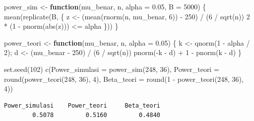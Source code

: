 \documentclass[
  indonesian,
  letterpaper,
]{book}
\newenvironment{Shaded}{\begin{snugshade}}{\end{snugshade}}
\newcommand{\AttributeTok}[1]{\textcolor[rgb]{0.40,0.45,0.13}{#1}}
\newcommand{\ControlFlowTok}[1]{\textcolor[rgb]{0.00,0.23,0.31}{\textbf{#1}}}
\newcommand{\DecValTok}[1]{\textcolor[rgb]{0.68,0.00,0.00}{#1}}
\newcommand{\FloatTok}[1]{\textcolor[rgb]{0.68,0.00,0.00}{#1}}
\newcommand{\FunctionTok}[1]{\textcolor[rgb]{0.28,0.35,0.67}{#1}}
\newcommand{\NormalTok}[1]{\textcolor[rgb]{0.00,0.23,0.31}{#1}}
\newcommand{\OtherTok}[1]{\textcolor[rgb]{0.00,0.23,0.31}{#1}}
\newcommand{\SpecialCharTok}[1]{\textcolor[rgb]{0.37,0.37,0.37}{#1}}
\begin{document}
\begin{Shaded}
\begin{Highlighting}[]
\NormalTok{power\_sim }\OtherTok{\textless{}{-}} \ControlFlowTok{function}\NormalTok{(mu\_benar, n, }\AttributeTok{alpha =} \FloatTok{0.05}\NormalTok{, }\AttributeTok{B =} \DecValTok{5000}\NormalTok{) \{}
  \FunctionTok{mean}\NormalTok{(}\FunctionTok{replicate}\NormalTok{(B, \{}
\NormalTok{    z }\OtherTok{\textless{}{-}}\NormalTok{ (}\FunctionTok{mean}\NormalTok{(}\FunctionTok{rnorm}\NormalTok{(n, mu\_benar, }\DecValTok{6}\NormalTok{)) }\SpecialCharTok{{-}} \DecValTok{250}\NormalTok{) }\SpecialCharTok{/}\NormalTok{ (}\DecValTok{6} \SpecialCharTok{/} \FunctionTok{sqrt}\NormalTok{(n))}
    \DecValTok{2} \SpecialCharTok{*}\NormalTok{ (}\DecValTok{1} \SpecialCharTok{{-}} \FunctionTok{pnorm}\NormalTok{(}\FunctionTok{abs}\NormalTok{(z))) }\SpecialCharTok{\textless{}=}\NormalTok{ alpha}
\NormalTok{  \}))}
\NormalTok{\}}

\NormalTok{power\_teori }\OtherTok{\textless{}{-}} \ControlFlowTok{function}\NormalTok{(mu\_benar, n, }\AttributeTok{alpha =} \FloatTok{0.05}\NormalTok{) \{}
\NormalTok{  k }\OtherTok{\textless{}{-}} \FunctionTok{qnorm}\NormalTok{(}\DecValTok{1} \SpecialCharTok{{-}}\NormalTok{ alpha }\SpecialCharTok{/} \DecValTok{2}\NormalTok{); d }\OtherTok{\textless{}{-}}\NormalTok{ (mu\_benar }\SpecialCharTok{{-}} \DecValTok{250}\NormalTok{) }\SpecialCharTok{/}\NormalTok{ (}\DecValTok{6} \SpecialCharTok{/} \FunctionTok{sqrt}\NormalTok{(n))}
  \FunctionTok{pnorm}\NormalTok{(}\SpecialCharTok{{-}}\NormalTok{k }\SpecialCharTok{{-}}\NormalTok{ d) }\SpecialCharTok{+} \DecValTok{1} \SpecialCharTok{{-}} \FunctionTok{pnorm}\NormalTok{(k }\SpecialCharTok{{-}}\NormalTok{ d)}
\NormalTok{\}}

\FunctionTok{set.seed}\NormalTok{(}\DecValTok{102}\NormalTok{)}
\FunctionTok{c}\NormalTok{(}\AttributeTok{Power\_simulasi =} \FunctionTok{power\_sim}\NormalTok{(}\DecValTok{248}\NormalTok{, }\DecValTok{36}\NormalTok{),}
  \AttributeTok{Power\_teori    =} \FunctionTok{round}\NormalTok{(}\FunctionTok{power\_teori}\NormalTok{(}\DecValTok{248}\NormalTok{, }\DecValTok{36}\NormalTok{), }\DecValTok{4}\NormalTok{),}
  \AttributeTok{Beta\_teori     =} \FunctionTok{round}\NormalTok{(}\DecValTok{1} \SpecialCharTok{{-}} \FunctionTok{power\_teori}\NormalTok{(}\DecValTok{248}\NormalTok{, }\DecValTok{36}\NormalTok{), }\DecValTok{4}\NormalTok{))}
\end{Highlighting}
\end{Shaded}

\begin{verbatim}
Power_simulasi    Power_teori     Beta_teori 
        0.5078         0.5160         0.4840 
\end{verbatim}
\end{document}
